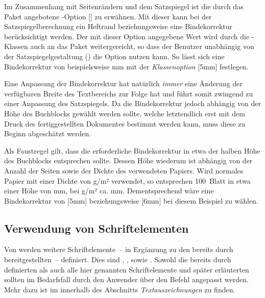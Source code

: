 \begin{Declaration*}{}
\begin{Declaration*}{}
\begin{Declaration*}{}
%
%
Im Zusammenhang mit Seitenrändern und dem Satzspiegel ist die durch das Paket 
 angebotene \KOMAScript-Option [] 
zu erwähnen. Mit dieser kann bei der Satzspiegelberechnung ein Heftrand 
beziehungsweise eine Bindekorrektur berücksichtigt werden. Der mit dieser 
Option angegebene Wert wird durch die \TUDScript-Klassen auch an das Paket 
 weitergereicht, so dass der Benutzer unabhängig von der 
Satzspiegelgestaltung () die Option  nutzen 
kann. So lässt sich eine Bindekorrektur von beispielsweise \unit[5]{mm} mit der 
\emph{Klassenoption} [5mm] festlegen.

Eine Anpassung der Bindekorrektur hat natürlich \emph{immer} eine Änderung der 
verfügbaren Breite des Textbereichs zur Folge hat und führt somit zwingend zu 
einer Anpassung des Satzspiegels. Da die Bindekorrektur jedoch abhängig von der 
Höhe des Buchblocks gewählt werden sollte, welche letztendlich erst mit dem 
Druck des fertiggestellten Dokumentes bestimmt werden kann, muss diese zu 
Beginn abgeschätzt werden.
%
\begin{Example}
Als Faustregel gilt, dass die erforderliche Bindekorrektur in etwa der halben 
Höhe des Buchblocks entsprechen sollte. Dessen Höhe wiederum ist abhängig von 
der Anzahl der Seiten sowie der Dichte des verwendeten Papiers. Wird normales 
Papier mit einer Dichte von \unit[80]{g/m²} verwendet, so entsprechen 100~Blatt 
in etwa einer Höhe von \unit[10]{mm}, bei \unit[100]{g/m²} ca. \unit[12]{mm}. 
Dementsprechend wäre eine Bindekorrektur von [5mm] beziehungsweise 
[6mm] bei diesem Beispiel zu wählen.
\end{Example}
%


\subsection{Verwendung von Schriftelementen}
\label{sec:fonts:elements}%
%
%
Von \TUDScript werden weitere Schriftelemente~-- in Ergänzung zu den bereits
durch \KOMAScript{} bereitgestellten~-- definiert. Dies sind , 
,  sowie . Sowohl die bereits 
durch \KOMAScript{} definierten als auch alle hier genannten Schriftelemente 
und später erläuterten sollten im Bedarfsfall durch den Anwender über den 
Befehl 
angepasst werden. Mehr dazu ist im \scrguide innerhalb des Abschnitts 
\emph{Textauszeichnungen} zu finden.



\end{Declaration*}
\end{Declaration*}
\end{Declaration*}
